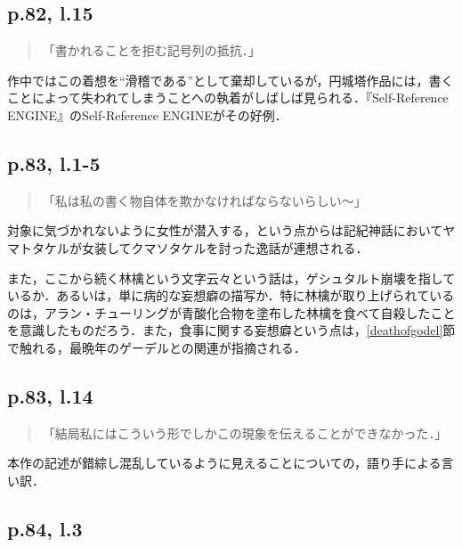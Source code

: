 \documentclass[10pt, a5paper, twoside]{ltjsarticle}
\begin{document}
        \subsection{p.82, l.15}\label{write}

            \begin{quote}
                「書かれることを拒む記号列の抵抗．」
            \end{quote}

            作中ではこの着想を“滑稽である”として棄却しているが，円城塔作品には，書くことによって失われてしまうことへの執着がしばしば見られる．『Self-Reference ENGINE』のSelf-Reference ENGINEがその好例．

        \subsection{p.83, l.1-5}

            \begin{quote}
                「私は私の書く物自体を欺かなければならないらしい〜」
            \end{quote}

            対象に気づかれないように女性が潜入する，という点からは記紀神話においてヤマトタケルが女装してクマソタケルを討った逸話が連想される．

            また，ここから続く林檎という文字云々という話は，ゲシュタルト崩壊を指しているか．あるいは，単に病的な妄想癖の描写か．特に林檎が取り上げられているのは，アラン・チューリングが青酸化合物を塗布した林檎を食べて自殺したことを意識したものだろう．また，食事に関する妄想癖という点は，\ref{deathofgodel}節で触れる，最晩年のゲーデルとの関連が指摘される．

        \subsection{p.83, l.14}

            \begin{quote}
                「結局私にはこういう形でしかこの現象を伝えることができなかった．」
            \end{quote}

            本作の記述が錯綜し混乱しているように見えることについての，語り手による言い訳．

        \subsection{p.84, l.3}
\end{document}
